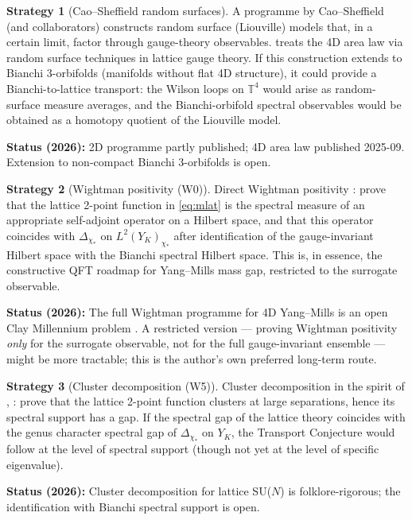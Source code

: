 \documentclass[11pt,a4paper,reqno]{amsart}
\theoremstyle{definition}
\newtheorem{strategy}{Strategy}
\newcommand{\YK}{Y_K}
\newcommand{\TT}{\mathbb{T}}
\begin{document}
\begin{strategy}[Cao--Sheffield random surfaces]\label{strat:CaoSheffield}
A programme by Cao--Sheffield (and collaborators) constructs random surface (Liouville) models that, in a certain limit, factor through gauge-theory observables. \cite{CaoSheffield2025} treats the 4D area law via random surface techniques in lattice gauge theory. If this construction extends to Bianchi 3-orbifolds (manifolds without flat 4D structure), it could provide a Bianchi-to-lattice transport: the Wilson loops on $\TT^4$ would arise as random-surface measure averages, and the Bianchi-orbifold spectral observables would be obtained as a homotopy quotient of the Liouville model.

\textbf{Status (2026):} 2D programme partly published; \cite{CaoSheffield2025} 4D area law published 2025-09. Extension to non-compact Bianchi 3-orbifolds is open.
\end{strategy}

\begin{strategy}[Wightman positivity (W0)]\label{strat:Wightman}
Direct Wightman positivity \cite{StreaterWightman1964}: prove that the lattice 2-point function in \eqref{eq:mlat} is the spectral measure of an appropriate self-adjoint operator on a Hilbert space, and that this operator coincides with $\Delta_{\chi_*}$ on $L^2(\YK)_{\chi_*}$ after identification of the gauge-invariant Hilbert space with the Bianchi spectral Hilbert space. This is, in essence, the constructive QFT roadmap for Yang--Mills mass gap, restricted to the surrogate observable.

\textbf{Status (2026):} The full Wightman programme for 4D Yang--Mills is an open Clay Millennium problem \cite{JaffeWitten2000}. A restricted version --- proving Wightman positivity \emph{only} for the surrogate observable, not for the full gauge-invariant ensemble --- might be more tractable; this is the author's own preferred long-term route.
\end{strategy}

\begin{strategy}[Cluster decomposition (W5)]\label{strat:Cluster}
Cluster decomposition in the spirit of \cite{Wightman1956}, \cite{HaagKastler1964}: prove that the lattice 2-point function clusters at large separations, hence its spectral support has a gap. If the spectral gap of the lattice theory coincides with the genus character spectral gap of $\Delta_{\chi_*}$ on $\YK$, the Transport Conjecture would follow at the level of spectral support (though not yet at the level of specific eigenvalue).

\textbf{Status (2026):} Cluster decomposition for lattice SU($N$) is folklore-rigorous; the identification with Bianchi spectral support is open.
\end{strategy}
\end{document}
